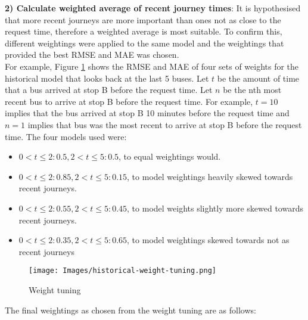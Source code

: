 \textbf{2) Calculate weighted average of recent journey times}: It is hypothesised that more recent journeys are more important than ones not as close to the request time, therefore a weighted average is most suitable. To confirm this, different weightings were applied to the same model and the weightings that provided the best RMSE and MAE was chosen. \\ 

For example, Figure \ref{fig:historical-weight-tuning} shows the RMSE and MAE of four sets of weights for the historical model that looks back at the last 5 buses. Let $t$ be the amount of time that a bus arrived at stop B before the request time. Let $n$ be the nth most recent bus to arrive at stop B before the request time. For example, $t = 10$ implies that the bus arrived at stop B 10 minutes before the request time and $n=1$ implies that bus was the most recent to arrive at stop B before the request time. The four models used were: 

\begin{itemize}
    \item $0 < t \leq 2: 0.5, 2 < t \leq 5: 0.5$, to equal weightings would.
    \item $0 < t \leq 2: 0.85, 2 < t \leq 5: 0.15$, to model weightings heavily skewed towards recent journeys.
    \item $0 < t \leq 2: 0.55, 2 < t \leq 5: 0.45$, to model weights slightly more skewed towards recent journeys.
    \item $0 < t \leq 2: 0.35, 2 < t \leq 5: 0.65$, to model weightings skewed towards not as recent journeys
\end{itemize}

\begin{figure}[H]
\begin{center}
    \texttt{[image: Images/historical-weight-tuning.png]}
    \caption{Weight tuning}
    \label{fig:historical-weight-tuning}
\end{center}
\end{figure}

The final weightings as chosen from the weight tuning are as follows: 


